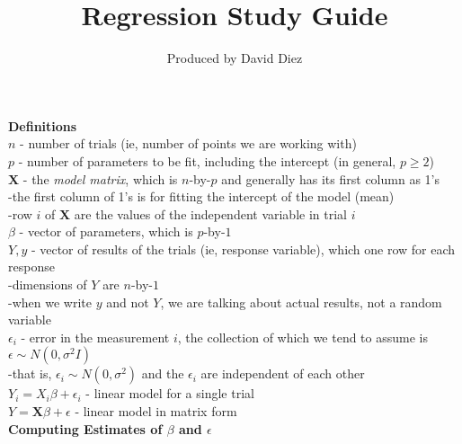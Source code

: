 \documentclass[11pt]{article}
\title{Regression Study Guide}
\author{Produced by David Diez}
\date{}                                           %
\begin{document}
\maketitle

\noindent\textbf{Definitions} \\

\noindent$n$ - number of trials (ie, number of points we are working with) \\
$p$ - number of parameters to be fit, including the intercept (in general, $p \geq 2$) \\
$\textbf{X}$ - the \textit{model matrix}, which is $n$-by-$p$ and generally has its first column as 1's \\
\indent -the first column of 1's is for fitting the intercept of the model (mean) \\
\indent -row $i$ of $\textbf{X}$ are the values of the independent variable in trial $i$ \\
$\beta$ - vector of parameters, which is $p$-by-$1$ \\
$Y,y$ - vector of results of the trials (ie, response variable), which one row for each response \\
\indent -dimensions of $Y$ are $n$-by-$1$ \\
\indent -when we write $y$ and not $Y$, we are talking about actual results, not a random variable \\
$\epsilon_i$ - error in the measurement $i$, the collection of which we tend to assume is $\epsilon \sim N(0,\sigma^2 I)$ \\
\indent -that is, $\epsilon_i \sim N(0,\sigma^2)$ and the $\epsilon_i$ are independent of each other \\
$Y_i = X_i\beta+\epsilon_i$ - linear model for a single trial \\
$Y = \textbf{X}\beta+\epsilon$ - linear model in matrix form \\

\noindent\textbf{Computing Estimates of $\beta$ and $\epsilon$} \\
\end{document}
